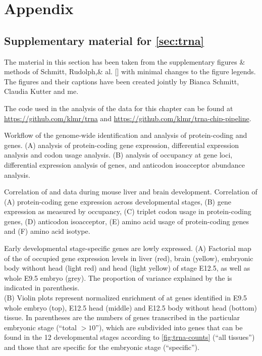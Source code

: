 \clearpage
{}
{}
\part*{Appendix}
\label{sec:appendix}

\chapter{Supplementary material for \texorpdfstring{\cref*{sec:trna}}{chapter 2}}

The material in this section has been taken from the supplementary figures \&
methods of Schmitt, Rudolph,\andothersdelim\& al. [\cite*{Schmitt:2014}] with
minimal changes to the figure legends. The figures and their captions have been
created jointly by Bianca Schmitt, Claudia Kutter and me.

The code used in the analysis of the data for this chapter can be found at
\url{https://github.com/klmr/trna} and
\url{https://github.com/klmr/trna-chip-pipeline}.

\begingroup
\renewcommand*\floatpos{H}

    {Workflow of the genome-wide identification and analysis of protein-coding
    and \trna genes.}
    {(A) \rnaseq analysis of protein-coding gene expression, differential
    expression analysis and codon usage analysis. (B) \chipseq analysis of 
    occupancy at \trna gene loci, differential expression analysis of \trna
    genes, and anticodon isoacceptor abundance analysis.}

    {Correlation of \rnaseq and  \chipseq data during mouse liver and brain
    development.}
    {Correlation of (A) protein-coding gene expression across developmental
    stages, (B) \trna gene expression as measured by  occupancy, (C)
    triplet codon usage in protein-coding genes, (D) \trna anticodon
    isoacceptor, (E) amino acid usage of protein-coding genes and (F) \trna
    amino acid isotype.}

    {Early developmental stage-specific \trna genes are lowly expressed.}
    {(A) Factorial map of the \pca of  occupied \trna gene expression
    levels in liver (red), brain (yellow), embryonic body without head (light
    red) and head (light yellow) of stage E12.5, as well as whole E9.5 embryo
    (grey). The proportion of variance explained by the  is indicated
    in parenthesis.\\
    (B) Violin plots represent normalized enrichment of  at \trna genes
    identified in E9.5 whole embryo (top), E12.5 head (middle) and E12.5 body
    without head (bottom) tissue. In parentheses are the numbers of \trna genes
    transcribed in the particular embryonic stage (“total \(>10\)”), which are
    subdivided into \trna genes that can be found in the \num{12} developmental
    stages according to \cref{fig:trna-counts} (“all tissues”) and those that
    are specific for the embryonic stage (“specific”).}

